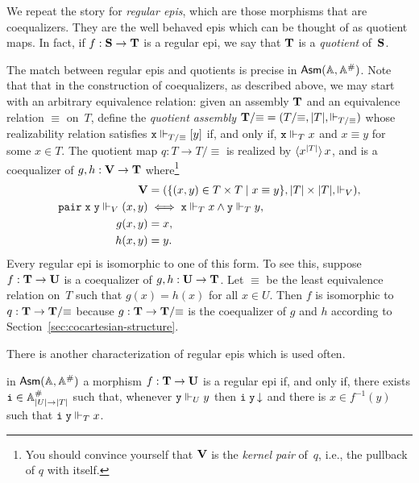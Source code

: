 We repeat the story for \emph{regular epis}, which are those morphisms
that are coequalizers. They are the well behaved epis which can be
thought of as quotient maps. In fact, if $f : \mathbf{S} \to \mathbf{T}$ is
a regular epi, we say that $\mathbf{T}$ is a \emph{quotient} of~$\mathbf{S}$.

The match between regular epis and quotients is precise in $\mathsf{Asm}(\mathbb{A},\mathbb{A}^{\#})$.
Note that that in the construction of coequalizers, as described
above, we may start with an arbitrary equivalence relation: given an
assembly $\mathbf{T}$ and an equivalence relation $\equiv$ on~$T$, define
the \emph{quotient assembly} $\mathbf{T}/{\equiv} = (T/{\equiv}, |T|,
\Vdash_{T/{\equiv}})$ whose realizability relation satisfies $\mathtt{x}
\Vdash_{T/{\equiv}} [y]$ if, and only if, $\mathtt{x} \Vdash_T x$ and $x \equiv
y$ for some $x \in T$. The quotient map $q : T \to T/{\equiv}$ is
realized by $\langle x^{|T|} \rangle\,x$, and is a coequalizer of $g,
h : \mathbf{V} \to \mathbf{T}$ where\footnote{You should convince yourself
  that $\mathbf{V}$ is the \emph{kernel pair} of~$q$, i.e., the pullback
  of $q$ with itself.}
%
\begin{align*}
  \mathbf{V} &= (\{(x,y) \in T \times T \mid x \equiv y\},
             |T| \times |T|, {\Vdash_V}),\\
  \mathtt{pair}\;\mathtt{x}\;\mathtt{y} \Vdash_V (x,y) &\iff
  \mathtt{x} \Vdash_T x \land \mathtt{y} \Vdash_T y, \\
  g (x, y) &= x,\\
  h (x, y) &= y.
\end{align*}
%
Every regular epi is isomorphic to one of this form. To see this,
suppose $f : \mathbf{T} \to \mathbf{U}$ is a coequalizer of $g, h : \mathbf{U}
\to \mathbf{T}$. Let $\equiv$ be the least equivalence relation on~$T$
such that $g(x) = h(x)$ for all $x \in U$. Then $f$ is isomorphic to
$q : \mathbf{T} \to \mathbf{T}/{\equiv}$ because $g : \mathbf{T} \to
\mathbf{T}/{\equiv}$ is the coequalizer of $g$ and $h$ according to
Section~\ref{sec:cocartesian-structure}.

There is another characterization of regular epis which is used often.

\begin{proposition}
  in $\mathsf{Asm}(\mathbb{A},\mathbb{A}^{\#})$ a morphism $f : \mathbf{T} \to \mathbf{U}$ is a regular epi
  if, and only if, there exists $\mathtt{i} \in \mathbb{A}^{\#}_{|U| \to |T|}$
  such that, whenever $\mathtt{y} \Vdash_U y$ then $\mathtt{i}\;\mathtt{y}\,{\downarrow}$
  and there is $x \in f^{-1}(y)$ such that $\mathtt{i}\;\mathtt{y} \Vdash_T x$.
\end{proposition}

